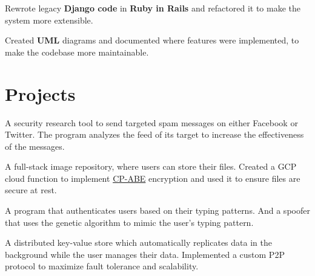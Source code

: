 \documentclass{article}
\begin{document}
\begin{bullets}
    \item Rewrote legacy \textbf{Django code} in \textbf{Ruby in Rails} and refactored it to make the system more extensible.
    \item Created \textbf{UML} diagrams and documented where features were implemented, to make the codebase more maintainable.
\end{bullets}
\sectionsep

\section{Projects}

A security research tool to send targeted spam messages on either Facebook or Twitter. The program analyzes the feed of its target to increase the effectiveness of the messages.\\
\sectionsep
  
A full-stack image repository, where users can store their files. Created a GCP cloud function to implement \href{https://www.cs.utexas.edu/~bwaters/publications/papers/cp-abe.pdf}{CP-ABE} encryption and used it to ensure files are secure at rest.\\
\sectionsep

A program that authenticates users based on their typing patterns. And a spoofer that uses the genetic algorithm to mimic the user's typing pattern.
\sectionsep

A distributed key-value store which automatically replicates data in the background while the user manages their data. Implemented a custom P2P protocol to maximize fault tolerance and scalability.\\
\sectionsep
\end{document}
